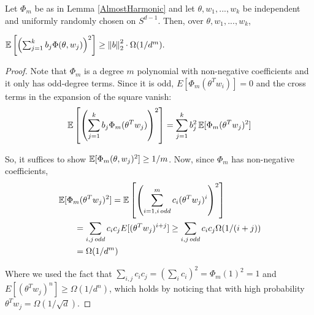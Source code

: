 \begin{lemma}\label{largeVariance}
  Let $\Phi_m$ be as in Lemma \ref{AlmostHarmonic}  and let $\theta, w_1,...,w_k$ be
  independent and uniformly randomly chosen on $S^{d-1}$. Then, over
  $\theta, w_1,...,w_k$,
 
 $\operatorname*{\mathbb{E}}\left[\left(  \sum_{j=1}^k b_j \Phi(\theta,w_j)\right)^2\right]
 \geq \left\lVert b \right\rVert_2^2 \cdot \Omega(1/d^m).$
\end{lemma}
%
\begin{proof}
Note that $\Phi_m$ is a degree $m$ polynomial with non-negative coefficients and it only has odd-degree terms. Since it is odd, $E[\Phi_m(\theta^Tw_i)] = 0$ and the cross terms in the expansion of the square vanish:
%
\[ \operatorname*{\mathbb{E}}\left[\left(  \sum_{j=1}^k b_j
     \Phi_m(\theta^Tw_j)\right)^2\right] = \sum_{j=1}^k b_j^2 \operatorname*{\mathbb{E}}[\Phi_m(\theta^Tw_j)^2]\]

So, it suffices to show $\operatorname*{\mathbb{E}}[\Phi_m(\theta,w_j)^2] \geq 1/m$.  Now, since $\Phi_m$ has non-negative coefficients,
\begin{align*}
& \operatorname*{\mathbb{E}}[\Phi_m(\theta^Tw_j)^2] = \operatorname*{\mathbb{E}}\left[\left(\sum_{i=1, i \,
                               odd}^m c_i
                               (\theta^Tw_j)^i\right)^2\right] \\
& \qquad = \sum_{i,j \,odd} c_ic_j E[(\theta^Tw_j)^{i+j}] \geq \sum_{i,j
  \,odd}c_i c_j \Omega(1/(i+j))  \\
& \qquad =\Omega(1/d^m) 
\end{align*}

Where we used the fact that
$\sum_{i,j} c_ic_j = (\sum_i c_i)^2 = \Phi_m(1)^2 = 1$ and
$E[(\theta^Tw_j)^{n}] \geq \Omega(1/d^{n})$, which holds by noticing that with high probability $\theta^T w_j = \Omega(1/\sqrt{d})$. 
\end{proof}
\fi




